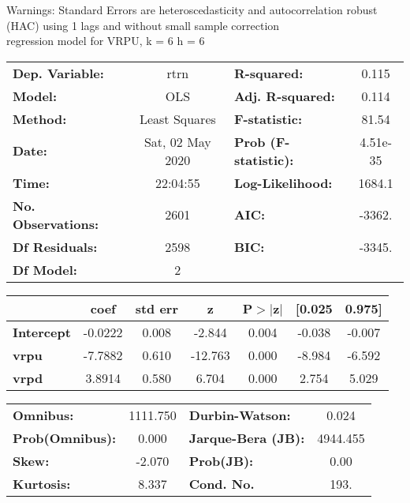 Warnings: \newline
 [1] Standard Errors are heteroscedasticity and autocorrelation robust (HAC) using 1 lags and without small sample correction\\ 

regression model for VRPU, k = 6 h = 6\begin{center}
\begin{tabular}{lclc}
\toprule
\textbf{Dep. Variable:}    &       rtrn       & \textbf{  R-squared:         } &     0.115   \\
\textbf{Model:}            &       OLS        & \textbf{  Adj. R-squared:    } &     0.114   \\
\textbf{Method:}           &  Least Squares   & \textbf{  F-statistic:       } &     81.54   \\
\textbf{Date:}             & Sat, 02 May 2020 & \textbf{  Prob (F-statistic):} &  4.51e-35   \\
\textbf{Time:}             &     22:04:55     & \textbf{  Log-Likelihood:    } &    1684.1   \\
\textbf{No. Observations:} &        2601      & \textbf{  AIC:               } &    -3362.   \\
\textbf{Df Residuals:}     &        2598      & \textbf{  BIC:               } &    -3345.   \\
\textbf{Df Model:}         &           2      & \textbf{                     } &             \\
\bottomrule
\end{tabular}
\begin{tabular}{lcccccc}
                   & \textbf{coef} & \textbf{std err} & \textbf{z} & \textbf{P$> |$z$|$} & \textbf{[0.025} & \textbf{0.975]}  \\
\midrule
\textbf{Intercept} &      -0.0222  &        0.008     &    -2.844  &         0.004        &       -0.038    &       -0.007     \\
\textbf{vrpu}      &      -7.7882  &        0.610     &   -12.763  &         0.000        &       -8.984    &       -6.592     \\
\textbf{vrpd}      &       3.8914  &        0.580     &     6.704  &         0.000        &        2.754    &        5.029     \\
\bottomrule
\end{tabular}
\begin{tabular}{lclc}
\textbf{Omnibus:}       & 1111.750 & \textbf{  Durbin-Watson:     } &    0.024  \\
\textbf{Prob(Omnibus):} &   0.000  & \textbf{  Jarque-Bera (JB):  } & 4944.455  \\
\textbf{Skew:}          &  -2.070  & \textbf{  Prob(JB):          } &     0.00  \\
\textbf{Kurtosis:}      &   8.337  & \textbf{  Cond. No.          } &     193.  \\
\bottomrule
\end{tabular}
\end{center}

